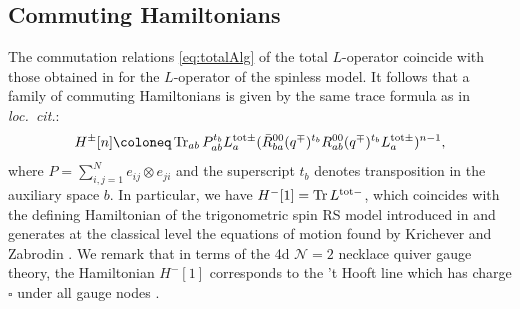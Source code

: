 \subsection{Commuting Hamiltonians}\label{sec:Hamiltonians}

The commutation relations \eqref{eq:totalAlg} of the total $L$-operator coincide with those obtained in \cite{arutyunov_quantum_2019} for the $L$-operator of the spinless model. It follows that a family of commuting Hamiltonians is given by the same trace formula as in \emph{loc.\ cit.}:
\begin{equation}\label{eq:traceFormula}
    H^\pm[n] \coloneq \Tr_{ab} P_{ab}^{t_b} L_a^{\text{tot}\pm} (\bar R_{ba}^{00}(q^{\mp})^{t_b} R_{ab}^{00}(q^{\mp})^{t_b} L_a^{\text{tot}\pm})^{n-1},
\end{equation}
where $P = \sum_{i,j=1}^N e_{ij} \otimes e_{ji}$ and the superscript $t_b$ denotes transposition in the auxiliary space $b$. In particular, we have $H^-[1] = \operatorname{Tr} L^{\text{tot}-}$, which coincides with the defining Hamiltonian of the trigonometric spin RS model introduced in \cite{arutyunov_spin_2026} and generates at the classical level the equations of motion found by Krichever and Zabrodin \cite{krichever_spin_1995}. We remark that in terms of the 4d $\mathcal{N}=2$ necklace quiver gauge theory, the Hamiltonian $H^-[1]$ corresponds to the 't Hooft line which has charge $\square$ under all gauge nodes \cite{maruyoshi_wilson-t_2021}.

